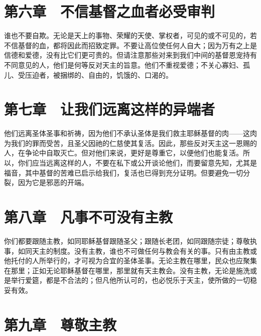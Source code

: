 
\section{第六章　不信基督之血者必受审判}

谁也不要自欺。无论是天上的事物、荣耀的天使、掌权者，可见的或不可见的，若不信基督的血，都将因此而招致定罪。不要让高位使任何人自大；因为万有之上是信德和爱德，没有比它们更可贵的。但请注意那些对来到我们中间的基督恩宠持有不同意见的人，他们是何等反对天主的旨意。他们不重视爱德；不关心寡妇、孤儿、受压迫者，被捆绑的、自由的，饥饿的、口渴的。\par


\section{第七章　让我们远离这样的异端者}

他们远离圣体圣事和祈祷，因为他们不承认圣体是我们救主耶稣基督的肉——这肉为我们的罪而受苦，且圣父因祂的仁慈使其复活。因此，那些反对天主这一恩赐的人，在争论中自取灭亡。但对他们来说，更好是尊重它，以便他们也能复活。所以，你们应当远离这样的人，不要在私下或公开谈论他们，而要留意先知，尤其是福音，其中基督的苦难已启示给我们，复活也已得到充分证明。但要避免一切分裂，因为它是邪恶的开端。\par


\section{第八章　凡事不可没有主教}

你们都要跟随主教，如同耶稣基督跟随圣父；跟随长老团，如同跟随宗徒；尊敬执事，如同天主的制度。没有主教，谁也不可做任何与教会有关的事。只有由主教或他托付的人所举行的，才可视为合宜的圣体圣事。无论主教在哪里，民众也应聚集在那里；正如无论耶稣基督在哪里，那里就有天主教会。没有主教，无论是施洗或是举行爱筵，都是不合法的；但凡他所认可的，也必悦乐于天主，使所做的一切稳妥有效。\par


\section{第九章　尊敬主教}

